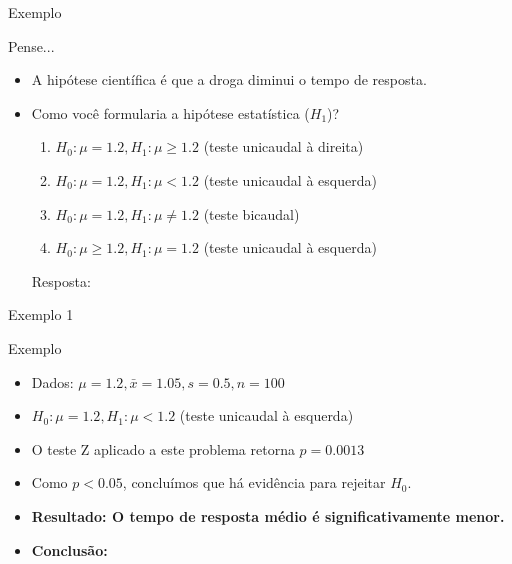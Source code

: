 \documentclass{beamer}
\begin{document}
\begin{frame}{Exemplo}
  \begin{block}{Pense...}
    \begin{itemize}
    \item A hipótese científica é que a droga diminui o tempo de resposta.
    \item Como você formularia a hipótese estatística ($H_1$)?
      \begin{enumerate}
      \item $H_0: \mu = 1.2, H_1: \mu \ge 1.2$ (teste unicaudal à direita)
      \item $H_0: \mu = 1.2, H_1: \mu < 1.2$ (teste unicaudal à esquerda)
      \item $H_0: \mu = 1.2, H_1: \mu \ne 1.2$ (teste bicaudal)
      \item $H_0: \mu \ge 1.2, H_1: \mu = 1.2$ (teste unicaudal à esquerda)
      \end{enumerate}

      Resposta: 
    \end{itemize}
  \end{block}
\end{frame}

\begin{frame}{Exemplo 1}
  \begin{exampleblock}{Exemplo}
    \begin{itemize}
    \item Dados: $\mu = 1.2, \bar{x} = 1.05, s = 0.5, n=100$
    \item $H_0: \mu = 1.2, H_1: \mu < 1.2$ (teste unicaudal à esquerda)
    \item O teste Z aplicado a este problema retorna $p=0.0013$
    \item<2-> Como $p < 0.05$, concluímos que há evidência para rejeitar
      $H_0$.
    \item<2-> {\bf Resultado: O tempo de resposta médio é \alert{significativamente} menor.}
    \item<2-> {\bf Conclusão: }
    \end{itemize}
  \end{exampleblock}
\end{frame}
\end{document}
